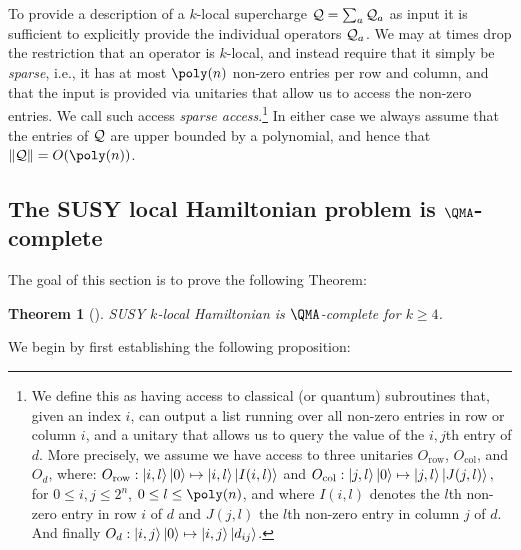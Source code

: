 \documentclass[11pt]{article}
\numberwithin{equation}{section}
\def\cQ{{\cal Q}}
\renewcommand\( {\left(}
\renewcommand\) {\right)}
\newtheorem{thm}{Theorem}
\begin{document}
To provide a description of a $k$-local supercharge  $\cQ=\sum_{a} \cQ_{a}$ as input it is sufficient to explicitly provide the individual operators $\cQ_{a}$. We may at times drop the restriction that an operator is $k$-local, and instead require that it simply be \emph{sparse}, i.e., it has at most $\poly(n)$ non-zero entries per row and column, and that the input is provided via unitaries that allow us to access the non-zero entries. We call such access \emph{sparse access}.\footnote{We define this as having access to classical (or quantum) subroutines that, given an index $i$, can output a list running over all non-zero entries in row or column $i$, and a unitary that allows us to query the value of the $i,j$th entry of $d$. More precisely, we assume we have access to three unitaries $O_{\text{row}}$, $O_{\text{col}}$, and $O_{d}$, where: $O_{\text{row}} : \ket{i,l}\ket{0} \mapsto \ket{i,l}\ket{I(i,l)}$ and $O_{\text{col}} : \ket{j,l}\ket{0} \mapsto \ket{j,l}\ket{J(j,l)},$ for $0 \leq i, j \leq 2^n$, $0 \leq l \leq \poly(n)$, and where $I(i,l)$ denotes the $l$th non-zero entry in row $i$ of $d$ and $J(j,l)$ the $l$th non-zero entry in column $j$ of $d$. And finally $O_{d} : \ket{i,j}\ket{0} \mapsto \ket{i,j}\ket{d_{ij}}$.} In either case we always assume that the entries of $\cQ$ are upper bounded by a polynomial, and hence that $\|\cQ\| = O(\poly(n))$.


\subsection{The SUSY local Hamiltonian problem is $\QMA$-complete }
\label{sec:The SUSY local Hamiltonian problem is QMA-complete}

 The goal of this section is to prove the following Theorem:
\begin{thm}[]\label{thmQMA}
 {\sc SUSY $k$-local Hamiltonian} is $\QMA$-complete for $k\geq 4$.
\end{thm}

\noindent We begin by  first establishing the following proposition:
\end{document}
